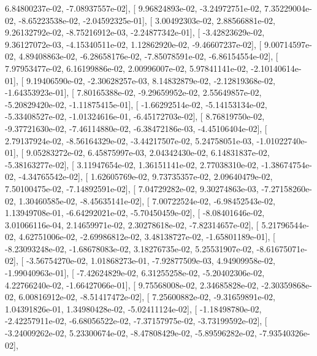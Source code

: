 \documentclass{article}
\begin{document}
          6.84800237e-02,  -7.08937557e-02],
       [  9.96824893e-02,  -3.24972751e-02,   7.35229004e-02,
         -8.65223538e-02,  -2.04592325e-01],
       [  3.00492303e-02,   2.88566881e-02,   9.26132792e-02,
         -8.75216912e-03,  -2.24877342e-01],
       [ -3.42823629e-02,   9.36127072e-03,  -4.15340511e-02,
          1.12862920e-02,  -9.46607237e-02],
       [  9.00714597e-02,   4.89408863e-02,  -6.28658176e-02,
         -7.85078591e-02,  -6.86154554e-02],
       [  7.97953477e-02,   6.16199886e-02,   2.00996007e-02,
          5.97841141e-02,  -2.10140614e-01],
       [  9.19406590e-02,  -2.30628257e-03,   8.14832879e-02,
         -2.12819368e-02,  -1.64353923e-01],
       [  7.80165388e-02,  -9.29659952e-02,   2.55649857e-02,
         -5.20829420e-02,  -1.11875415e-01],
       [ -1.66292514e-02,  -5.14153134e-02,  -5.33408527e-02,
         -1.01324616e-01,  -6.45172703e-02],
       [  8.76819750e-02,  -9.37721630e-02,  -7.46114880e-02,
         -6.38472186e-03,  -4.45106404e-02],
       [  2.79137924e-02,  -8.56164329e-02,  -3.44217507e-02,
          5.24758051e-03,  -1.01022740e-01],
       [  9.05283272e-02,   6.45875997e-03,   2.04342430e-02,
          6.14831837e-02,  -5.38163277e-02],
       [  3.11947654e-02,   1.36151141e-02,   2.77038310e-02,
         -1.38674754e-02,  -4.34765542e-02],
       [  1.62605769e-02,   9.73735357e-02,   2.09640479e-02,
          7.50100475e-02,  -7.14892591e-02],
       [  7.04729282e-02,   9.30274863e-03,  -7.27158260e-02,
          1.30460585e-02,  -8.45635141e-02],
       [  7.00722524e-02,  -6.98452543e-02,   1.13949708e-01,
         -6.64292021e-02,  -5.70450459e-02],
       [ -8.08401646e-02,   3.01066116e-04,   2.14659971e-02,
          2.30278618e-02,  -7.82314657e-02],
       [  5.21796544e-02,   4.62751006e-02,  -2.69986812e-02,
          3.48138727e-02,  -1.65801189e-01],
       [ -8.23093248e-02,  -1.68678083e-02,   3.18276735e-02,
          5.25531907e-02,  -8.61675071e-02],
       [ -3.56754270e-02,   1.01868273e-01,  -7.92877509e-03,
          4.94909958e-02,  -1.99040963e-01],
       [ -7.42624829e-02,   6.31255258e-02,  -5.20402306e-02,
          4.22766240e-02,  -1.66427066e-01],
       [  9.75568008e-02,   2.34685828e-02,  -2.30359868e-02,
          6.00816912e-02,  -8.51417472e-02],
       [  7.25600882e-02,  -9.31659891e-02,   1.04391826e-01,
          1.34980428e-02,  -5.02411124e-02],
       [ -1.18498780e-02,  -2.42257911e-02,  -6.68056522e-02,
         -7.37157975e-02,  -3.73199592e-02],
       [ -3.24009262e-02,   5.23300674e-02,  -8.47808429e-02,
         -5.89596282e-02,  -7.93540326e-02],
\end{document}
